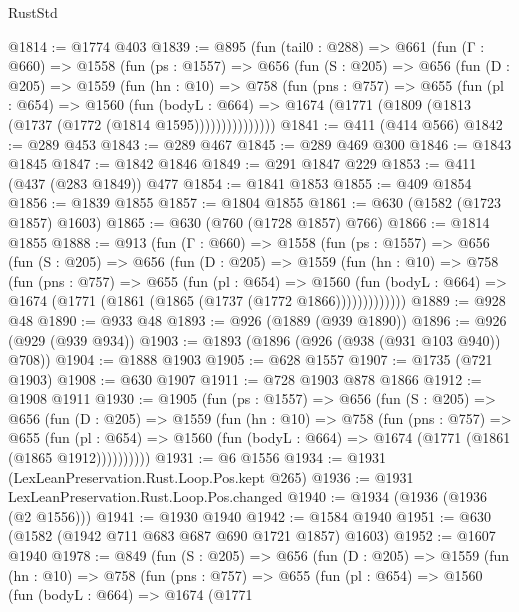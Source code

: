 \begin{lexlean}{RustStd}
\begin{coremodule}
@1814 := @1774 @403
@1839 := @895
    (fun (tail0 : @288) =>
    @661
      (fun (Γ : @660) =>
      @1558
        (fun (ps : @1557) =>
        @656
          (fun (S : @205) =>
          @656
            (fun (D : @205) =>
            @1559
              (fun (hn : @10) =>
              @758
                (fun (pns : @757) =>
                @655
                  (fun (pl : @654) =>
                  @1560
                    (fun (bodyL : @664) =>
                    @1674 (@1771 (@1809 (@1813 (@1737 (@1772 (@1814 @1595)))))))))))))))
@1841 := @411 (@414 @566)
@1842 := @289 @453
@1843 := @289 @467
@1845 := @289 @469 @300
@1846 := @1843 @1845
@1847 := @1842 @1846
@1849 := @291 @1847 @229
@1853 := @411 (@437 (@283 @1849)) @477
@1854 := @1841 @1853
@1855 := @409 @1854
@1856 := @1839 @1855
@1857 := @1804 @1855
@1861 := @630 (@1582 (@1723 @1857) @1603)
@1865 := @630 (@760 (@1728 @1857) @766)
@1866 := @1814 @1855
@1888 := @913
    (fun (Γ : @660) =>
    @1558
      (fun (ps : @1557) =>
      @656
        (fun (S : @205) =>
        @656
          (fun (D : @205) =>
          @1559
            (fun (hn : @10) =>
            @758
              (fun (pns : @757) =>
              @655
                (fun (pl : @654) =>
                @1560
                  (fun (bodyL : @664) => @1674 (@1771 (@1861 (@1865 (@1737 (@1772 @1866)))))))))))))
@1889 := @928 @48
@1890 := @933 @48
@1893 := @926 (@1889 (@939 @1890))
@1896 := @926 (@929 (@939 @934))
@1903 := @1893 (@1896 (@926 (@938 (@931 @103 @940)) @708))
@1904 := @1888 @1903
@1905 := @628 @1557
@1907 := @1735 (@721 @1903)
@1908 := @630 @1907
@1911 := @728 @1903 @878 @1866
@1912 := @1908 @1911
@1930 := @1905
    (fun (ps : @1557) =>
    @656
      (fun (S : @205) =>
      @656
        (fun (D : @205) =>
        @1559
          (fun (hn : @10) =>
          @758
            (fun (pns : @757) =>
            @655
              (fun (pl : @654) =>
              @1560 (fun (bodyL : @664) => @1674 (@1771 (@1861 (@1865 @1912))))))))))
@1931 := @6 @1556
@1934 := @1931 (LexLeanPreservation.Rust.Loop.Pos.kept @265)
@1936 := @1931 LexLeanPreservation.Rust.Loop.Pos.changed
@1940 := @1934 (@1936 (@1936 (@2 @1556)))
@1941 := @1930 @1940
@1942 := @1584 @1940
@1951 := @630 (@1582 (@1942 @711 @683 @687 @690 @1721 @1857) @1603)
@1952 := @1607 @1940
@1978 := @849
    (fun (S : @205) =>
    @656
      (fun (D : @205) =>
      @1559
        (fun (hn : @10) =>
        @758
          (fun (pns : @757) =>
          @655
            (fun (pl : @654) =>
            @1560
              (fun (bodyL : @664) =>
              @1674
                (@1771

\end{coremodule}
\end{lexlean}
